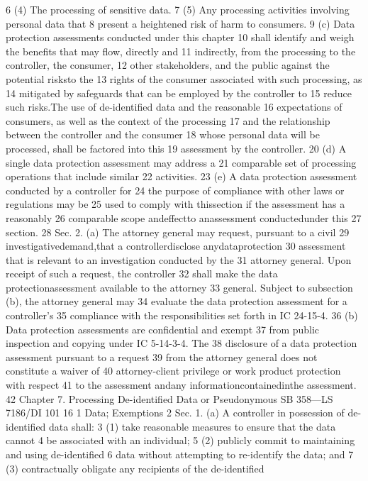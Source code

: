 6 (4) The processing of sensitive data.
7 (5) Any processing activities involving personal data that
8 present a heightened risk of harm to consumers.
9 (c) Data protection assessments conducted under this chapter
10 shall identify and weigh the benefits that may flow, directly and
11 indirectly, from the processing to the controller, the consumer,
12 other stakeholders, and the public against the potential risksto the
13 rights of the consumer associated with such processing, as
14 mitigated by safeguards that can be employed by the controller to
15 reduce such risks.The use of de-identified data and the reasonable
16 expectations of consumers, as well as the context of the processing
17 and the relationship between the controller and the consumer
18 whose personal data will be processed, shall be factored into this
19 assessment by the controller.
20 (d) A single data protection assessment may address a
21 comparable set of processing operations that include similar
22 activities.
23 (e) A data protection assessment conducted by a controller for
24 the purpose of compliance with other laws or regulations may be
25 used to comply with thissection if the assessment has a reasonably
26 comparable scope andeffectto anassessment conductedunder this
27 section.
28 Sec. 2. (a) The attorney general may request, pursuant to a civil
29 investigativedemand,that a controllerdisclose anydataprotection
30 assessment that is relevant to an investigation conducted by the
31 attorney general. Upon receipt of such a request, the controller
32 shall make the data protectionassessment available to the attorney
33 general. Subject to subsection (b), the attorney general may
34 evaluate the data protection assessment for a controller's
35 compliance with the responsibilities set forth in IC 24-15-4.
36 (b) Data protection assessments are confidential and exempt
37 from public inspection and copying under IC 5-14-3-4. The
38 disclosure of a data protection assessment pursuant to a request
39 from the attorney general does not constitute a waiver of
40 attorney-client privilege or work product protection with respect
41 to the assessment andany informationcontainedinthe assessment.
42 Chapter 7. Processing De-identified Data or Pseudonymous
SB 358—LS 7186/DI 101
16
1 Data; Exemptions
2 Sec. 1. (a) A controller in possession of de-identified data shall:
3 (1) take reasonable measures to ensure that the data cannot
4 be associated with an individual;
5 (2) publicly commit to maintaining and using de-identified
6 data without attempting to re-identify the data; and
7 (3) contractually obligate any recipients of the de-identified
